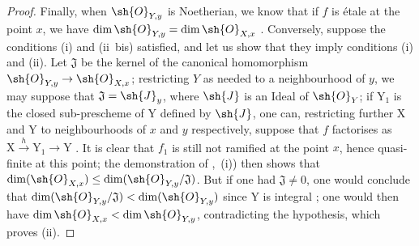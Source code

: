 \begin{proof}
Finally, when $\sh{O}_{Y,y}$ is Noetherian, we know that if $f$ is \'etale at the point $x$, we have $\dim\sh{O}_{Y,y}=\dim\sh{O}_{X,x}$ .
Conversely, suppose the conditions (i) and (ii~bis) satisfied, and let us show that they imply conditions (i) and (ii).
Let $\mathfrak{J}$ be the kernel of the canonical homomorphism $\sh{O}_{Y,y}\to\sh{O}_{X,x}$; restricting $Y$ as needed to a neighbourhood of $y$, we may suppose that $\mathfrak{J}=\sh{J}_y$, where $\sh{J}$ is an Ideal of $\sh{O}_Y$; if $\mathrm{Y}_1$ is the closed sub-prescheme of $\mathrm{Y}$ defined by $\sh{J}$, one can, restricting further $\mathrm{X}$ and $\mathrm{Y}$ to neighbourhoods of $x$ and $y$ respectively, suppose that $f$ factorises as $\mathrm{X}\xrightarrow{h}\mathrm{Y}_1\to\mathrm{Y}$ .
It is clear that $f_1$ is still not ramified at the point $x$, hence  quasi-finite at this point; the demonstration of ,~(i)) then shows that $\dim(\sh{O}_{X,x})\leq\dim(\sh{O}_{Y,y}/\mathfrak{J})$.
But if one had $\mathfrak{J}\neq 0$, one would conclude that $\dim(\sh{O}_{Y,y}/\mathfrak{J})<\dim(\sh{O}_{Y,y})$ since $\mathrm{Y}$ is integral ; one would then have $\dim\sh{O}_{X,x}<\dim\sh{O}_{Y,y}$, contradicting the hypothesis, which proves (ii).
\end{proof}


